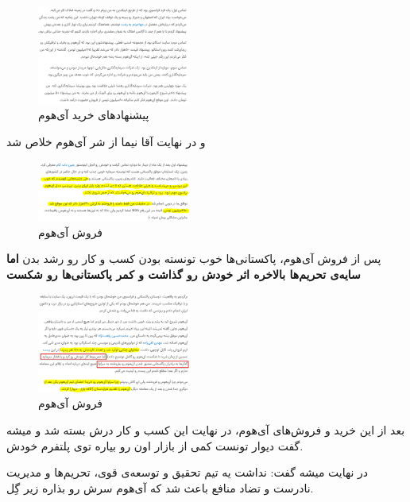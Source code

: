 \documentclass[dvipsnames, svgnames, x11names, 11pt, twocolumn]{article}
\begin{document}
\begin{figure}[H]
\begin{center}
\includegraphics[width=0.45\textwidth, height=0.2\textheight]{images/buy-ihome}
\caption{پیشنهاد‌های خرید آی‌هوم}
\end{center}
\end{figure}
و در نهایت آقا نیما از شر آی‌هوم خلاص شد
\begin{figure}[H]
\begin{center}
\includegraphics[width=0.45\textwidth, height=0.13\textheight]{images/sell-ihome}
\caption{فروش آی‌هوم}
\end{center}
\end{figure}

پس از فروش آی‌هوم، پاکستانی‌ها خوب تونسته بودن کسب و کار رو رشد بدن \textbf{اما سایه‌ی تحریم‌ها بالاخره اثر خودش رو گذاشت و کمر پاکستانی‌ها رو شکست}

\begin{figure}[H]
\begin{center}
\includegraphics[width=0.45\textwidth, height=0.2\textheight]{images/sanctions}
\caption{فروش آی‌هوم}
\end{center}
\end{figure}

بعد از این خرید و فروش‌های آی‌هوم، در نهایت این کسب و کار درش بسته شد و میشه گفت دیوار تونست کمی از بازار اون رو بیاره توی پلتفرم خودش.

در نهایت میشه گفت: نداشت یه تیم تحقیق و توسعه‌ی قوی، تحریم‌ها و مدیریت نادرست و تضاد منافع باعث شد که آی‌هوم سرش رو بذاره زیر گِل.
\end{document}
